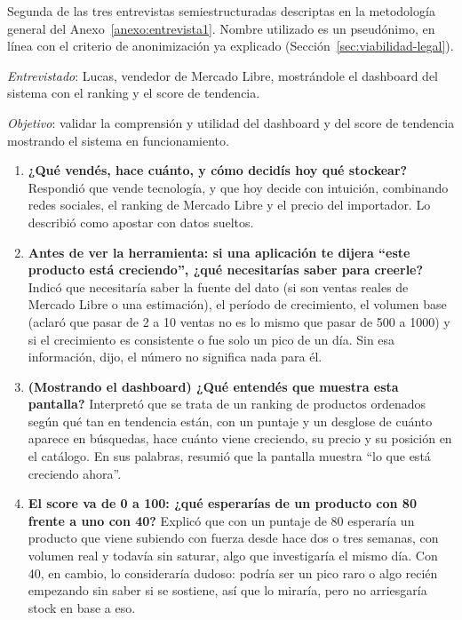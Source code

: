 \label{anexo:entrevista2}

Segunda de las tres entrevistas semiestructuradas descriptas en la metodología general del Anexo~\ref{anexo:entrevista1}. Nombre utilizado es un pseudónimo, en línea con el criterio de anonimización ya explicado (Sección~\ref{sec:viabilidad-legal}).

\emph{Entrevistado}: Lucas, vendedor de Mercado Libre, mostrándole el dashboard del sistema con el ranking y el score de tendencia.

\emph{Objetivo}: validar la comprensión y utilidad del dashboard y del score de tendencia mostrando el sistema en funcionamiento.

\begin{enumerate}
	\item \textbf{¿Qué vendés, hace cuánto, y cómo decidís hoy qué stockear?} Respondió que vende tecnología, y que hoy decide con intuición, combinando redes sociales, el ranking de Mercado Libre y el precio del importador. Lo describió como apostar con datos sueltos.
	\item \textbf{Antes de ver la herramienta: si una aplicación te dijera ``este producto está creciendo'', ¿qué necesitarías saber para creerle?} Indicó que necesitaría saber la fuente del dato (si son ventas reales de Mercado Libre o una estimación), el período de crecimiento, el volumen base (aclaró que pasar de 2 a 10 ventas no es lo mismo que pasar de 500 a 1000) y si el crecimiento es consistente o fue solo un pico de un día. Sin esa información, dijo, el número no significa nada para él.
	\item \textbf{(Mostrando el dashboard) ¿Qué entendés que muestra esta pantalla?} Interpretó que se trata de un ranking de productos ordenados según qué tan en tendencia están, con un puntaje y un desglose de cuánto aparece en búsquedas, hace cuánto viene creciendo, su precio y su posición en el catálogo. En sus palabras, resumió que la pantalla muestra ``lo que está creciendo ahora''.
	\item \textbf{El score va de 0 a 100: ¿qué esperarías de un producto con 80 frente a uno con 40?} Explicó que con un puntaje de 80 esperaría un producto que viene subiendo con fuerza desde hace dos o tres semanas, con volumen real y todavía sin saturar, algo que investigaría el mismo día. Con 40, en cambio, lo consideraría dudoso: podría ser un pico raro o algo recién empezando sin saber si se sostiene, así que lo miraría, pero no arriesgaría stock en base a eso.

\end{enumerate}
